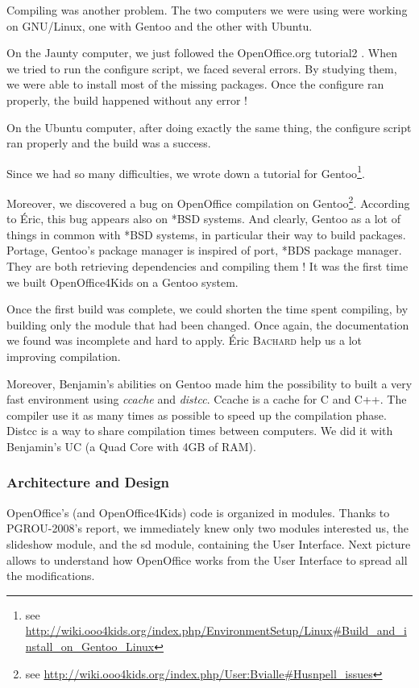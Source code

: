 \documentclass[a4paper,11pt]{article}
\begin{document}
Compiling was another problem. The two computers we were using were working on
GNU/Linux, one with Gentoo and the other with Ubuntu.

On the Jaunty computer, we just followed the OpenOffice.org tutorial2 . When
we tried to run the configure script, we faced several errors. By studying
them, we were able to install most of the missing packages. Once the configure
ran properly, the build happened without any error !

On the Ubuntu computer, after doing exactly the same thing, the configure
script ran properly and the build was a success.

Since we had so many difficulties, we wrote down a tutorial for
Gentoo\footnote{see
\url{http://wiki.ooo4kids.org/index.php/EnvironmentSetup/Linux\#Build\_and\_install\_on\_Gentoo\_Linux}}.

Moreover, we discovered a bug on OpenOffice compilation on Gentoo\footnote{see
\url{http://wiki.ooo4kids.org/index.php/User:Bvialle\#Husnpell\_issues}}.
According to Éric, this bug appears also on *BSD systems. And clearly, Gentoo
as a lot of things in common with *BSD systems, in particular their way to
build packages. Portage, Gentoo's package manager is inspired of port, *BDS
package manager. They are both retrieving dependencies and compiling them ! It
was the first time we built OpenOffice4Kids on a Gentoo system.

Once the first build was complete, we could shorten the time spent compiling,
by building only the module that had been changed. Once again, the
documentation we found was incomplete and hard to apply. Éric \textsc{Bachard}
help us a lot improving compilation.

Moreover, Benjamin's abilities on Gentoo made him the possibility to built a
very fast environment using \emph{ccache} and \emph{distcc}. Ccache is a cache
for C and C++. The compiler use it as many times as possible to speed up the
compilation phase. Distcc is a way to share compilation times between
computers. We did it with Benjamin's UC (a Quad Core with 4GB of RAM).


\subsubsection*{Architecture and Design}

OpenOffice’s (and OpenOffice4Kids) code is organized in modules. Thanks to
PGROU-2008’s report, we immediately knew only two modules interested us, the
slideshow module, and the sd module, containing the User Interface. Next
picture allows to understand how OpenOffice works from the User Interface to
spread all the modifications.
\end{document}
